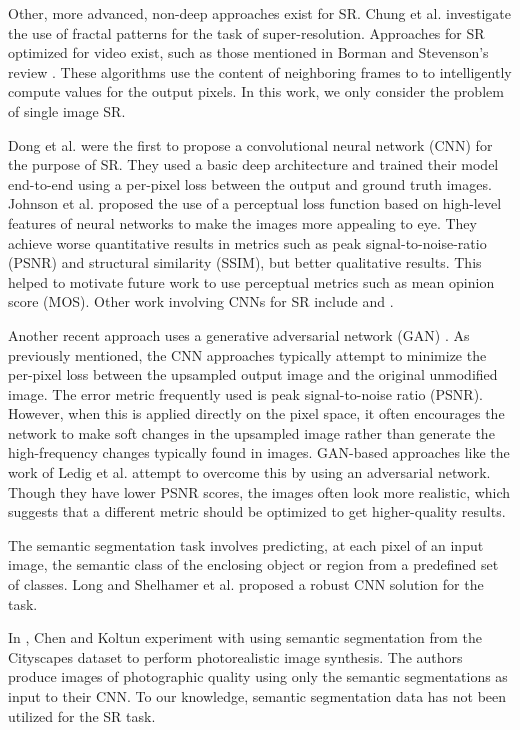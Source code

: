 \documentclass[10pt,twocolumn,letterpaper]{article}
\begin{document}
Other, more advanced, non-deep approaches exist for SR. Chung et al.
\cite{FractalSR} investigate the use of fractal patterns for the task of
super-resolution. Approaches for SR optimized for video exist, such as those
mentioned in Borman and Stevenson's review \cite{VideoSR}. These algorithms use
the content of neighboring frames to to intelligently compute values for the
output pixels. In this work, we only consider the problem of single image SR.

Dong et al. \cite{SRCNN} were the first to propose a convolutional neural
network (CNN) for the purpose of SR.  They used a basic deep architecture and
trained their model end-to-end using a per-pixel loss between the output and
ground truth images. Johnson et al.  \cite{PerceptualLosses} proposed the use
of a perceptual loss function based on high-level features of neural networks
to make the images more appealing to eye. They achieve worse quantitative
results in metrics such as peak signal-to-noise-ratio (PSNR) and structural
similarity (SSIM), but better qualitative results. This helped to motivate
future work to use perceptual metrics such as mean opinion score (MOS). Other
work involving CNNs for SR include \cite{RealtimeCNN} and
\cite{DeeplyRecursive}.

Another recent approach uses a generative adversarial network (GAN) \cite{GAN}.
As previously mentioned, the CNN approaches typically attempt to minimize the
per-pixel loss between the upsampled output image and the original unmodified
image. The error metric frequently used is peak signal-to-noise ratio (PSNR).
However, when this is applied directly on the pixel space, it often
encourages the network to make soft changes in the upsampled image rather than
generate the high-frequency changes typically found in images. GAN-based
approaches like the work of Ledig et al. \cite{SRGAN} attempt to overcome this
by using an adversarial network. Though they have lower PSNR scores, the images
often look more realistic, which suggests that a different metric should be
optimized to get higher-quality results.

The semantic segmentation task involves predicting, at each pixel of an input
image, the semantic class of the enclosing object or region from a predefined
set of classes. Long and Shelhamer et al. \cite{FullyConvolutionalSS} proposed
a robust CNN solution for the task.

In \cite{ImageSynthesis}, Chen and Koltun experiment with using semantic
segmentation from the Cityscapes dataset \cite{Cityscapes} to perform
photorealistic image synthesis. The authors produce images of photographic
quality using only the semantic segmentations as input to their CNN. To our
knowledge, semantic segmentation data has not been utilized for the SR task.
\end{document}
